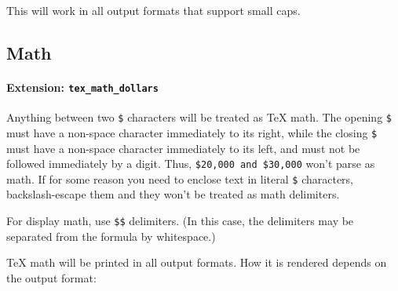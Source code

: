 \documentclass[]{article}
\begin{document}
This will work in all output formats that support small caps.

\hypertarget{math}{%
\subsection{Math}\label{math}}

\hypertarget{extension-tex_math_dollars}{%
\paragraph{\texorpdfstring{Extension:
\texttt{tex\_math\_dollars}}{Extension: tex\_math\_dollars}}\label{extension-tex_math_dollars}}

Anything between two \texttt{\$} characters will be treated as TeX math.
The opening \texttt{\$} must have a non-space character immediately to
its right, while the closing \texttt{\$} must have a non-space character
immediately to its left, and must not be followed immediately by a
digit. Thus, \texttt{\$20,000\ and\ \$30,000} won't parse as math. If
for some reason you need to enclose text in literal \texttt{\$}
characters, backslash-escape them and they won't be treated as math
delimiters.

For display math, use \texttt{\$\$} delimiters. (In this case, the
delimiters may be separated from the formula by whitespace.)

TeX math will be printed in all output formats. How it is rendered
depends on the output format:
\end{document}
